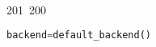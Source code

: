 201~200~\documentclass{article}
\begin{document}
\begin{lstlisting}[language=Python, caption=Key Derivation with HKDF]
	                                                                                                                                                                                                                                                                                                	                                                                                                                                        	    	                                                                                                	                                                                                                                                                                                                                                                                                                                                	                                        backend=default_backend()
	                                                                                                                                                                                                                                                                                                	                                                                                                                                        	    	                                                                                                	                                                                                                                                                                                                                                                                                                                                	                                            )
	                                                                                                                                                                                                                                                                                                	                                                                                                                                        	    	                                                                                                	                                                                                                                                                                                                                                                                                                                                	                                                return hkdf.derive(userkey)


\end{lstlisting}
\end{document}
